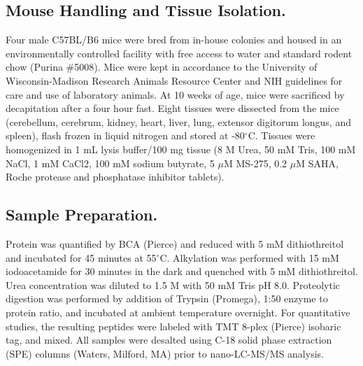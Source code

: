 \subsection*{Mouse Handling and Tissue Isolation.}
Four male C57BL/B6 mice were bred from in-house colonies and housed in an environmentally controlled facility with free access to water and standard rodent chow (Purina \#5008). Mice were kept in accordance to the University of Wisconsin-Madison Research Animals Resource Center and NIH guidelines for care and use of laboratory animals. At 10 weeks of age, mice were sacrificed by decapitation after a four hour fast. Eight tissues were dissected from the mice (cerebellum, cerebrum, kidney, heart, liver, lung, extensor digitorum longus, and spleen), flash frozen in liquid nitrogen and stored at -80$^\circ$C. Tissues were homogenized in 1 mL lysis buffer/100 mg tissue (8 M Urea, 50 mM Tris, 100 mM NaCl, 1 mM CaCl2, 100 mM sodium butyrate, 5 $\mu$M MS-275, 0.2 $\mu$M SAHA, Roche protease and phosphatase inhibitor tablets).

\subsection*{Sample Preparation.}
Protein was quantified by BCA (Pierce) and reduced with 5 mM dithiothreitol and incubated for 45 minutes at 55$^\circ$C. Alkylation was performed with 15 mM iodoacetamide for 30 minutes in the dark and quenched with 5 mM dithiothreitol. Urea concentration was diluted to 1.5 M with 50 mM Tris pH 8.0. Proteolytic digestion was performed by addition of Trypsin (Promega), 1:50 enzyme to protein ratio, and incubated at ambient temperature overnight. For quantitative studies, the resulting peptides were labeled with TMT 8-plex (Pierce) isobaric tag, and mixed. All samples were desalted using C-18 solid phase extraction (SPE) columns (Waters, Milford, MA) prior to nano-LC-MS/MS analysis.

